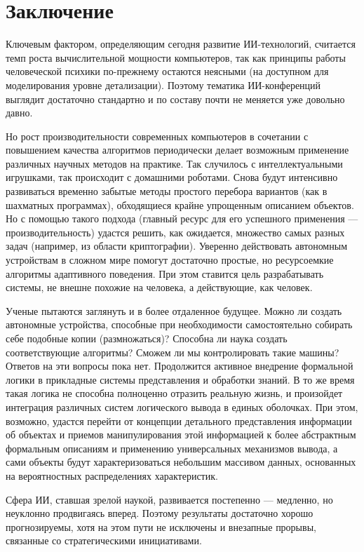 \section{Заключение}

Ключевым фактором, определяющим сегодня развитие ИИ-технологий, считается темп роста вычислительной мощности компьютеров, так как принципы работы человеческой психики по-прежнему остаются неясными (на доступном для моделирования уровне детализации). Поэтому тематика ИИ-конференций выглядит достаточно стандартно и по составу почти не меняется уже довольно давно.

Но рост производительности современных компьютеров в сочетании с повышением качества алгоритмов периодически делает возможным применение различных научных методов на практике. Так случилось с интеллектуальными игрушками, так происходит с домашними роботами. Снова будут интенсивно развиваться временно забытые методы простого перебора вариантов (как в шахматных программах), обходящиеся крайне упрощенным описанием объектов. Но с помощью такого подхода (главный ресурс для его успешного применения --- производительность) удастся решить, как ожидается, множество самых разных задач (например, из области криптографии). Уверенно действовать автономным устройствам в сложном мире помогут достаточно простые, но ресурсоемкие алгоритмы адаптивного поведения. При этом ставится цель разрабатывать системы, не внешне похожие на человека, а действующие, как человек.

Ученые пытаются заглянуть и в более отдаленное будущее. Можно ли создать автономные устройства, способные при необходимости самостоятельно собирать себе подобные копии (размножаться)? Способна ли наука создать соответствующие алгоритмы? Сможем ли мы контролировать такие машины? Ответов на эти вопросы пока нет. Продолжится активное внедрение формальной логики в прикладные системы представления и обработки знаний. В то же время такая логика не способна полноценно отразить реальную жизнь, и произойдет интеграция различных систем логического вывода в единых оболочках. При этом, возможно, удастся перейти от концепции детального представления информации об объектах и приемов манипулирования этой информацией к более абстрактным формальным описаниям и применению универсальных механизмов вывода, а сами объекты будут характеризоваться небольшим массивом данных, основанных на вероятностных распределениях характеристик.

Сфера ИИ, ставшая зрелой наукой, развивается постепенно --- медленно, но неуклонно продвигаясь вперед. Поэтому результаты достаточно хорошо прогнозируемы, хотя на этом пути не исключены и внезапные прорывы, связанные со стратегическими инициативами. 

